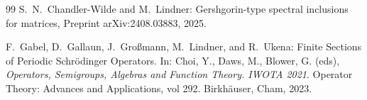 \documentclass[preprint,1p,11pt]{elsarticle}
\numberwithin{equation}{section}   %
\numberwithin{figure}{section}  %
\begin{document}
\begin{thebibliography}{99} \label{sec:biblios}
{\sc S.~N.~Chandler-Wilde} and {\sc M.~Lindner:}
Gershgorin-type spectral inclusions for matrices,
Preprint	arXiv:2408.03883, 2025.

{\sc F.~Gabel,  D.~Gallaun, J.~Gro{\ss}mann, M.~Lindner,} and {\sc R.~Ukena:}
Finite Sections of Periodic Schr{\"o}dinger Operators. In: Choi, Y., Daws, M., Blower, G. (eds), {\it Operators, Semigroups, Algebras and Function Theory. IWOTA 2021}. Operator Theory: Advances and Applications, vol 292. 
Birkhäuser, Cham, 2023.
\end{thebibliography}
\end{document}

